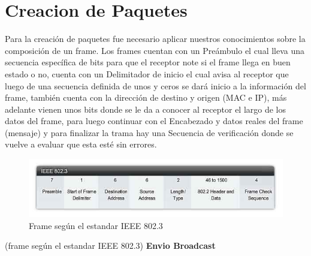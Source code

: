 \documentclass{udpreport}
\begin{document}
	\section{Creacion de Paquetes}
		Para la creación de paquetes fue necesario aplicar nuestros conocimientos sobre la composición de un frame.
		Los frames cuentan con un Preámbulo el cual lleva una secuencia específica de bits para que el receptor note si el
		frame llega en buen estado o no, cuenta con un Delimitador de inicio el cual avisa al receptor que luego de una
		secuencia definida de unos y ceros se dará inicio a la información del frame, también cuenta con la dirección de
		destino y origen (MAC e IP), más adelante vienen unos bits donde se le da a conocer al receptor el largo de los datos
		del frame, para luego continuar con el Encabezado y datos reales del frame (mensaje) y para finalizar la trama hay una
		Secuencia de verificación donde se vuelve a evaluar que esta esté sin errores.\\
		\begin{figure}[h]
		    \centering
		    \includegraphics[width=\textwidth]{frame.jpg}
		    \caption{Frame según el estandar IEEE 802.3}
		\end{figure}
		(frame según el estandar IEEE 802.3)
		{\bf Envio Broadcast}\\
\end{document}
